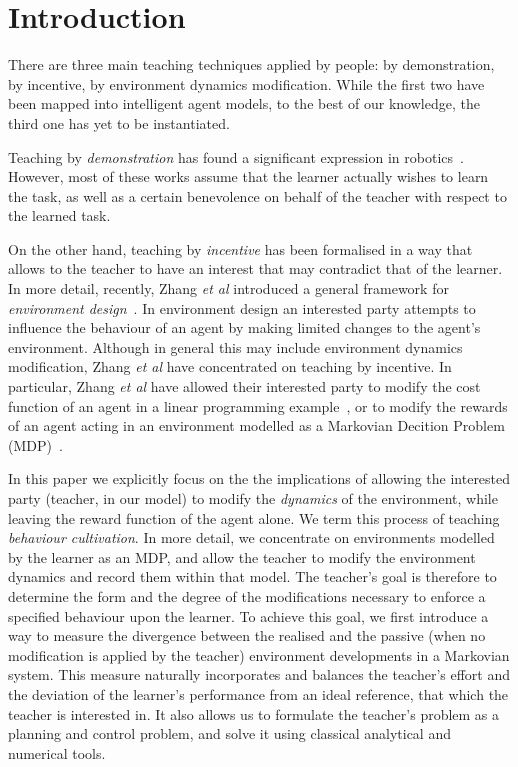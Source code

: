 

\section{Introduction}

There are three main teaching techniques applied by people: by
demonstration, by incentive, by environment dynamics
modification. While the
first two have been mapped into intelligent agent models, to the best
of our knowledge, the third one has yet to be instantiated.

Teaching by {\em demonstration} has found a significant expression in
robotics~\cite{argal_etal_2009}. However, most of these works assume
that the learner actually wishes to learn the task, as well as a
certain benevolence on behalf of the teacher with respect to the
learned task.

On the other hand, teaching by {\em incentive} has been formalised in a way
that allows to the teacher to have an interest that may contradict
that of the learner. In more detail, recently, Zhang \emph{et al}
introduced a general framework for \emph{environment
  design}~\cite{Zhang09:General}. In environment design an interested
party attempts to influence the behaviour of an agent by making limited
changes to the agent's environment. Although in general this may
include environment dynamics modification, Zhang \emph{et al} have
concentrated on teaching by incentive. In particular, Zhang \emph{et
  al} have allowed their interested party to modify the cost function
of an agent in a linear programming example~\cite{Zhang09:General}, or
to modify the rewards of an agent acting in an environment modelled as
a Markovian Decition Problem (MDP)~\cite{zhang_parkes_2008,Zhang09:Policy}.

In this paper we explicitly focus on the the implications of allowing
the interested party (teacher, in our model) to modify the
\emph{dynamics} of the environment, while leaving the reward function
of the agent alone. We term this process of teaching {\em behaviour
  cultivation}. In more detail, we concentrate on environments
modelled by the learner as an MDP, and allow the teacher to modify the
environment dynamics and record them within that model. The teacher's
goal is therefore to determine the form and the degree of the
modifications necessary to enforce a specified behaviour upon the
learner. To achieve this goal, we first introduce a way to measure the
divergence between the realised and the passive (when no modification
is applied by the teacher) environment developments in a Markovian
system. This measure naturally incorporates and balances the teacher's
effort and the deviation of the learner's performance from an ideal
reference, that which the teacher is interested in. It also allows us
to formulate the teacher's problem as a planning and control problem,
and solve it using classical analytical and numerical tools.

